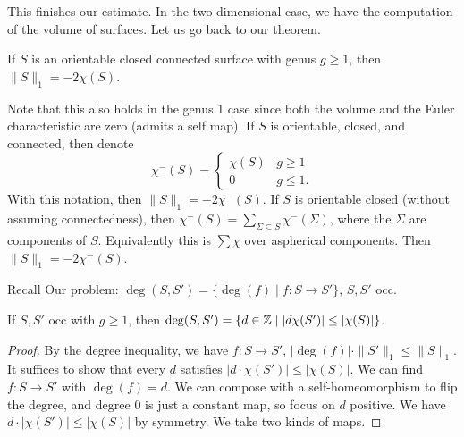 This finishes our estimate. In the two-dimensional case, we have the computation of the volume of surfaces. Let us go back to our theorem.
\begin{theorem}
    If $S$ is an orientable closed connected surface with genus $g \geq 1$, then $\| S\|_1=-2 \chi (S)$.
\end{theorem}
Note that this also holds in the genus 1 case since both the volume and the Euler characteristic are zero (admits a self map). If $S$ is orientable, closed, and connected, then denote \[\chi^-(S)= \begin{cases}
        \chi\left( S\right) & g \geq 1\\
        0 & g \leq 1.
    \end{cases}\] 
    With this notation, then $\| S\|_1=-2\chi^- (S)$. If $S$ is orientable closed (without assuming connectedness), then $\chi^-(S)=\sum_{\Sigma \subseteq S} \chi^-(\Sigma)$, where the $\Sigma$ are components of $S$. Equivalently this is $\sum \chi$ over aspherical components. Then $\|S\|_1=-2\chi^-(S)$.
    \begin{namedthing}{Recall} 
        Our problem: $\deg(S,S')= \{\deg (f) \mid f \colon S \to S'\} $, $S,S'$ occ. 
    \end{namedthing}
    \begin{prop}
        If $S,S'$ occ with $g \geq 1$, then $\deg(S,S')=\{ d \in \mathbb{Z} \mid |d \chi(S')| \leq |\chi(S)|\}$.
    \end{prop}
    \begin{proof}
        By the degree inequality, we have $f \colon S \to S'$, $|\deg(f)| \cdot \|S'\|_1 \leq \|S\|_1$. It suffices to show that every $d$ satisfies $|d \cdot \chi(S')| \leq |\chi(S)|$. We can find $f \colon S \to S'$ with $\deg(f)=d$. We can compose with a self-homeomorphism to flip the degree, and degree 0 is just a constant map, so focus on $d$ positive. We have $d \cdot |\chi(S')| \leq |\chi(S)|$ by symmetry. We take two kinds of maps.
    \end{proof}
